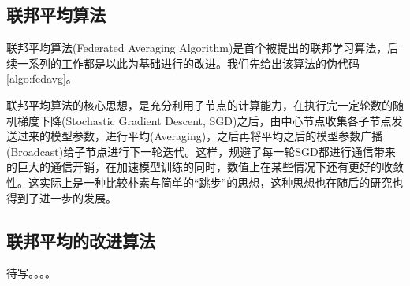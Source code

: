 \subsection{联邦平均算法}
\label{subsec:chap2-overview-fedavg}

联邦平均算法(Federated Averaging Algorithm)\cite{mcmahan2017fed_avg}是首个被提出的联邦学习算法，后续一系列的工作都是以此为基础进行的改进。我们先给出该算法的伪代码\ref{algo:fedavg}。



联邦平均算法的核心思想，是充分利用子节点的计算能力，在执行完一定轮数的随机梯度下降(Stochastic Gradient Descent, SGD)之后，由中心节点收集各子节点发送过来的模型参数，进行平均(Averaging)，之后再将平均之后的模型参数广播(Broadcast)给子节点进行下一轮迭代。这样，规避了每一轮SGD都进行通信带来的巨大的通信开销，在加速模型训练的同时，数值上在某些情况下还有更好的收敛性。这实际上是一种比较朴素与简单的``跳步''的思想，这种思想也在随后的研究\cite{zhang2020fedpd, proxskip, proxskip-vr}也得到了进一步的发展。


\subsection{联邦平均的改进算法}
\label{subsec:chap2-overview-fedavg-improve}

待写。。。。



